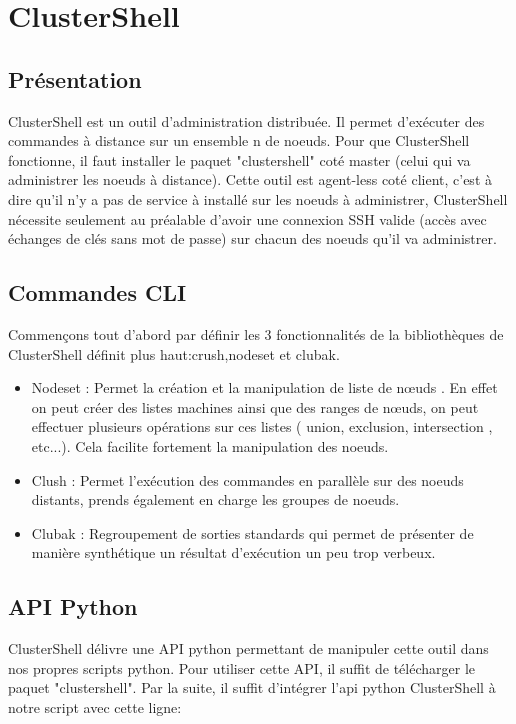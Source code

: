\documentclass[a4paper,11pt]{article}
\begin{document}
\section{ClusterShell}
\label{sec:section2}
\subsection{Présentation}
\label{sub:2.1}

ClusterShell est un outil d'administration distribuée. Il permet d'exécuter des commandes à distance sur un ensemble n de noeuds. 
\smallbreak
Pour que ClusterShell fonctionne, il faut installer le paquet "clustershell" coté master (celui qui va administrer les noeuds à distance).
Cette outil est agent-less coté client, c'est à dire qu'il n'y a pas de service à installé sur les noeuds à administrer, ClusterShell nécessite seulement au préalable d'avoir une connexion SSH valide (accès avec échanges de clés sans mot de passe) sur chacun des noeuds qu'il va administrer.

\subsection{Commandes CLI}
\label{sub:2.2}
Commençons tout d'abord par définir les 3 fonctionnalités de la bibliothèques de ClusterShell définit plus haut:crush,nodeset et clubak.
\begin{itemize}
\item Nodeset : Permet la création et la manipulation de liste de nœuds . En effet on peut créer des listes machines ainsi que des ranges de nœuds, on peut effectuer plusieurs opérations sur ces listes ( union, exclusion, intersection , etc...). Cela facilite fortement la manipulation des noeuds.
\item Clush : Permet l'exécution des commandes en parallèle sur des noeuds distants, prends également en charge les groupes de noeuds.
\item Clubak : Regroupement de sorties standards qui permet de présenter de manière synthétique un résultat d'exécution un peu trop verbeux.
\end{itemize}

\subsection{API Python}
\label{sub:2.3}
ClusterShell délivre une API python permettant de manipuler cette outil dans nos propres scripts python.
\smallbreak
Pour utiliser cette API, il suffit de télécharger le paquet "clustershell".
\smallbreak
Par la suite, il suffit d'intégrer l'api python ClusterShell à notre script avec cette ligne:
\end{document}
